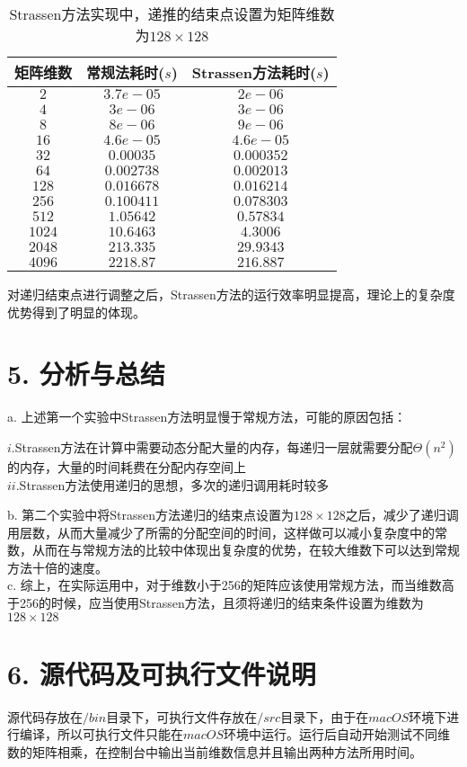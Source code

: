 \documentclass[12pt]{article}
\begin{document}
    \begin{table}[H]
      \begin{center}
        \caption{Strassen方法实现中，递推的结束点设置为矩阵维数为$128\times128$}
        \begin{tabular}{c|c|c}
          \toprule
          \textbf{矩阵维数} & \textbf{常规法耗时($s$)} & \textbf{Strassen方法耗时($s$)}\\
          \midrule
          $2$ & $3.7e-05$ & $2e-06$\\
          $4$ & $3e-06$ & $3e-06$\\
          $8$ & $8e-06$ & $9e-06$\\
          $16$ & $4.6e-05$ & $4.6e-05$\\
          $32$ & $0.00035$ & $0.000352$\\
          $64$ & $0.002738$ & $0.002013$\\
          $128$ & $0.016678$ & $0.016214$\\
          $256$ & $0.100411$ & $0.078303$\\
          $512$ & $1.05642$ & $0.57834$\\
          $1024$ & $10.6463$ & $4.3006$\\
          $2048$ & $213.335$ & $29.9343$\\
          $4096$ & $2218.87$ & $216.887$\\
          \bottomrule
        \end{tabular}
      \end{center}
    \end{table}
    对递归结束点进行调整之后，Strassen方法的运行效率明显提高，理论上的复杂度优势得到了明显的体现。
  \section*{5. 分析与总结}
  a. 上述第一个实验中Strassen方法明显慢于常规方法，可能的原因包括：
  \begin{adjustwidth}{1cm}{1cm}
  $i.$Strassen方法在计算中需要动态分配大量的内存，每递归一层就需要分配$\Theta(n^2)$的内存，大量的时间耗费在分配内存空间上\\
  $ii.$Strassen方法使用递归的思想，多次的递归调用耗时较多
  \end{adjustwidth}
  b. 第二个实验中将Strassen方法递归的结束点设置为$128 \times 128$之后，减少了递归调用层数，从而大量减少了所需的分配空间的时间，这样做可以减小复杂度中的常数，从而在与常规方法的比较中体现出复杂度的优势，在较大维数下可以达到常规方法十倍的速度。\\
  c. 综上，在实际运用中，对于维数小于256的矩阵应该使用常规方法，而当维数高于256的时候，应当使用Strassen方法，且须将递归的结束条件设置为维数为$128\times128$
  \section*{6. 源代码及可执行文件说明}
  源代码存放在$/bin$目录下，可执行文件存放在$/src$目录下，由于在$macOS$环境下进行编译，所以可执行文件只能在$macOS$环境中运行。运行后自动开始测试不同维数的矩阵相乘，在控制台中输出当前维数信息并且输出两种方法所用时间。
\end{document}
